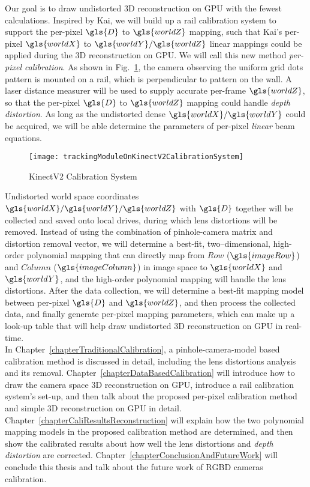 Our goal is to draw undistorted \gls{3D} reconstruction on \gls{GPU} with the fewest calculations. Inspired by Kai, we will build up a rail calibration system to support the per-pixel \(\gls{D}\) to \(\gls{worldZ}\) mapping, such that Kai's per-pixel \(\gls{worldX}\) to \(\gls{worldY}/\gls{worldZ}\) linear mappings could be applied during the \gls{3D} reconstruction on \gls{GPU}. We will call this new method \textit{per-pixel calibration}. As shown in Fig.~\ref{trackingModuleOnKinectV2CalibrationSystem}, the camera observing the uniform grid dots pattern is mounted on a rail, which is perpendicular to pattern on the wall. A laser distance measurer will be used to supply accurate per-frame \(\gls{worldZ}\), so that the per-pixel \(\gls{D}\) to \(\gls{worldZ}\) mapping could handle \emph{depth distortion}. As long as the undistorted dense \(\gls{worldX}/\gls{worldY}\) could be acquired, we will be able determine the parameters of per-pixel \emph{linear} beam equations.
\\\indent
\begin{figure}[t]
\centering
\texttt{[image: trackingModuleOnKinectV2CalibrationSystem]}
\caption{\gls{KinectV2} Calibration System}
\label{trackingModuleOnKinectV2CalibrationSystem}
\end{figure}%
Undistorted world space coordinates \(\gls{worldX}/\gls{worldY}/\gls{worldZ}\) with \(\gls{D}\) together will be collected and saved onto local drives, during which lens distortions will be removed. Instead of using the combination of pinhole-camera matrix and distortion removal vector, we will determine a best-fit, two--dimensional, high-order polynomial mapping that can directly map from \(Row\) (\(\gls{imageRow}\)) and \(Column\) (\(\gls{imageColumn}\)) in image space to \(\gls{worldX}\) and \(\gls{worldY}\), and the high-order polynomial mapping will handle the lens distortions. After the data collection, we will determine a best-fit mapping model between per-pixel \(\gls{D}\) and \(\gls{worldZ}\), and then process the collected data, and finally generate per-pixel mapping parameters, which can make up a look-up table that will help draw undistorted \gls{3D} reconstruction on \gls{GPU} in real-time.
\\\indent
In Chapter~\ref{chapterTraditionalCalibration}, a pinhole-camera-model based calibration method is discussed in detail, including the lens distortions analysis and its removal. Chapter~\ref{chapterDataBasedCalibration} will introduce how to draw the camera space \gls{3D} reconstruction on \gls{GPU}, introduce a rail calibration system's set-up, and then talk about the proposed per-pixel calibration method and simple \gls{3D} reconstruction on \gls{GPU} in detail. Chapter~\ref{chapterCaliResultsReconstruction} will explain how the two polynomial mapping models in the proposed calibration method are determined, and then show the calibrated results about how well the lens distortions and \emph{depth distortion} are corrected. Chapter~\ref{chapterConclusionAndFutureWork} will conclude this thesis and talk about the future work of \gls{RGBD} cameras calibration.
